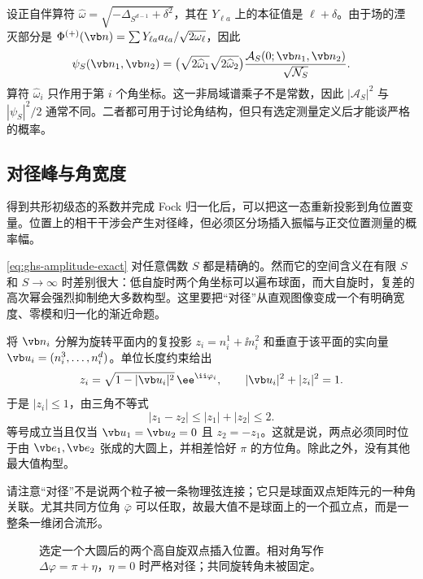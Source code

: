 设正自伴算符 $\widehat\omega=\sqrt{-\Delta_{S^{d-1}}+\delta^2}$，其在 $Y_{\ell a}$ 上的本征值是 $\ell+\delta$。由于场的湮灭部分是 $\Phi^{(+)}(\vb n)=\sum Y_{\ell a}a_{\ell a}/\sqrt{2\omega_\ell}$，因此
\begin{equation}\label{eq:ghs-canonical-vs-field}
 \psi_S(\vb n_1,\vb n_2)
 =\bigl(\sqrt{2\widehat\omega_1}\sqrt{2\widehat\omega_2}\bigr)
 \frac{\mathcal A_S(0;\vb n_1,\vb n_2)}{\sqrt{\mathcal N_S}}.
\end{equation}
算符 $\widehat\omega_i$ 只作用于第 $i$ 个角坐标。这一非局域谱乘子不是常数，因此 $|\mathcal A_S|^2$ 与 $|\psi_S|^2/2$ 通常不同。二者都可用于讨论角结构，但只有选定测量定义后才能谈严格的概率。


\subsection{对径峰与角宽度}

得到共形初级态的系数并完成 Fock 归一化后，可以把这一态重新投影到角位置变量。位置上的相干干涉会产生对径峰，但必须区分场插入振幅与正交位置测量的概率幅。


\cref{eq:ghs-amplitude-exact} 对任意偶数 $S$ 都是精确的。然而它的空间含义在有限 $S$ 和 $S\to\infty$ 时差别很大：低自旋时两个角坐标可以遍布球面，而大自旋时，复差的高次幂会强烈抑制绝大多数构型。这里要把“对径”从直观图像变成一个有明确宽度、零模和归一化的渐近命题。


将 $\vb n_i$ 分解为旋转平面内的复投影 $z_i=n_i^1+\ii n_i^2$ 和垂直于该平面的实向量 $\vb u_i=(n_i^3,\ldots,n_i^d)$。单位长度约束给出
\begin{equation}\label{eq:ghs-angular-coordinates}
 z_i=\sqrt{1-|\vb u_i|^2}\,\ee^{\ii\varphi_i},\qquad
 |\vb u_i|^2+|z_i|^2=1.
\end{equation}
于是 $|z_i|\le1$，由三角不等式
\begin{equation}\label{eq:ghs-antipodal-bound}
 |z_1-z_2|\le|z_1|+|z_2|\le2.
\end{equation}
等号成立当且仅当 $\vb u_1=\vb u_2=0$ 且 $z_2=-z_1$。这就是说，两点必须同时位于由 $\vb e_1,\vb e_2$ 张成的大圆上，并相差恰好 $\pi$ 的方位角。除此之外，没有其他最大值构型。

请注意“对径”不是说两个粒子被一条物理弦连接；它只是球面双点矩阵元的一种角关联。尤其共同方位角 $\bar\varphi$ 可以任取，故最大值不是球面上的一个孤立点，而是一整条一维闭合流形。

\begin{figure}[htbp]
\centering

\caption{选定一个大圆后的两个高自旋双点插入位置。相对角写作 $\Delta\varphi=\pi+\eta$，$\eta=0$ 时严格对径；共同旋转角未被固定。}\label{fig:ghs-antipodal-circle-geometry}
\end{figure}

